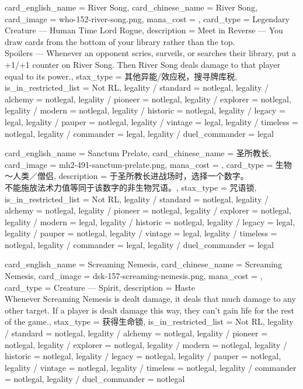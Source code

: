 \documentclass[lang = cn, color = black, 10pt]{AllThatStax}
\begin{document}
\card
{
	card_english_name = {River Song},
	card_chinese_name = {River Song},
	card_image = who-152-river-song.png,
	mana_cost = ,
	card_type = Legendary Creature — Human Time Lord Rogue,
	description = {Meet in Reverse — You draw cards from the bottom of your library rather than the top.\\
		Spoilers — Whenever an opponent scries, surveils, or searches their library, put a +1/+1 counter on River Song. Then River Song deals damage to that player equal to its power.},
	stax_type = 其他异能/效应税，搜寻牌库税,
	is_in_restricted_list = Not RL,
	legality / standard = notlegal,
	legality / alchemy = notlegal,
	legality / pioneer = notlegal,
	legality / explorer = notlegal,
	legality / modern = notlegal,
	legality / historic = notlegal,
	legality / legacy = legal,
	legality / pauper = notlegal,
	legality / vintage = legal,
	legality / timeless = notlegal,
	legality / commander = legal,
	legality / duel_commander = legal
}

\card
{
	card_english_name = {Sanctum Prelate},
	card_chinese_name = {圣所教长},
	card_image = mh2-491-sanctum-prelate.png,
	mana_cost = ,
	card_type = 生物 ～人类／僧侣,
	description = {于圣所教长进战场时，选择一个数字。\\
		不能施放法术力值等同于该数字的非生物咒语。},
	stax_type = 咒语锁,
	is_in_restricted_list = Not RL,
	legality / standard = notlegal,
	legality / alchemy = notlegal,
	legality / pioneer = notlegal,
	legality / explorer = notlegal,
	legality / modern = legal,
	legality / historic = notlegal,
	legality / legacy = legal,
	legality / pauper = notlegal,
	legality / vintage = legal,
	legality / timeless = notlegal,
	legality / commander = legal,
	legality / duel_commander = legal
}

\card
{
	card_english_name = {Screaming Nemesis},
	card_chinese_name = {Screaming Nemesis},
	card_image = dsk-157-screaming-nemesis.png,
	mana_cost = ,
	card_type = Creature — Spirit,
	description = {Haste\\
		Whenever Screaming Nemesis is dealt damage, it deals that much damage to any other target. If a player is dealt damage this way, they can't gain life for the rest of the game.},
	stax_type = 获得生命锁,
	is_in_restricted_list = Not RL,
	legality / standard = notlegal,
	legality / alchemy = notlegal,
	legality / pioneer = notlegal,
	legality / explorer = notlegal,
	legality / modern = notlegal,
	legality / historic = notlegal,
	legality / legacy = notlegal,
	legality / pauper = notlegal,
	legality / vintage = notlegal,
	legality / timeless = notlegal,
	legality / commander = notlegal,
	legality / duel_commander = notlegal
}
\end{document}
